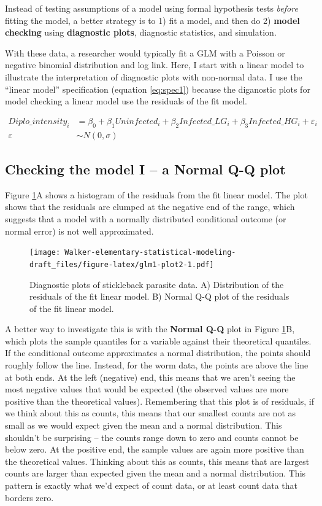 \documentclass[]{book}
\begin{document}
Instead of testing assumptions of a model using formal hypothesis tests
\emph{before} fitting the model, a better strategy is to 1) fit a model,
and then do 2) \textbf{model checking} using \textbf{diagnostic plots},
diagnostic statistics, and simulation.

With these data, a researcher would typically fit a GLM with a Poisson
or negative binomial distribution and log link. Here, I start with a
linear model to illustrate the interpretation of diagnostic plots with
non-normal data. I use the ``linear model'' specification (equation
\eqref{eq:spec1}) because the diganostic plots for model checking a linear
model use the residuals of the fit model.

\begin{align}
Diplo\_intensity_i &= \beta_0 + \beta_1 Uninfected_i + \beta_2 Infected\_LG_i + \beta_3 Infected\_HG_i + \varepsilon_i \\
\varepsilon &\sim N(0, \sigma)
\label{eq:worm-lm}
\end{align}

\subsection{Checking the model I -- a Normal Q-Q
plot}\label{checking-the-model-i-a-normal-q-q-plot}

Figure \ref{fig:glm1-plot2}A shows a histogram of the residuals from the
fit linear model. The plot shows that the residuals are clumped at the
negative end of the range, which suggests that a model with a normally
distributed conditional outcome (or normal error) is not well
approximated.

\begin{figure}
\centering
\texttt{[image: Walker-elementary-statistical-modeling-draft\_files/figure-latex/glm1-plot2-1.pdf]}
\caption{\label{fig:glm1-plot2}Diagnostic plots of stickleback parasite
data. A) Distribution of the residuals of the fit linear model. B)
Normal Q-Q plot of the residuals of the fit linear model.}
\end{figure}

A better way to investigate this is with the \textbf{Normal Q-Q} plot in
Figure \ref{fig:glm1-plot2}B, which plots the sample quantiles for a
variable against their theoretical quantiles. If the conditional outcome
approximates a normal distribution, the points should roughly follow the
line. Instead, for the worm data, the points are above the line at both
ends. At the left (negative) end, this means that we aren't seeing the
most negative values that would be expected (the observed values are
more positive than the theoretical values). Remembering that this plot
is of residuals, if we think about this as counts, this means that our
smallest counts are not as small as we would expect given the mean and a
normal distribution. This shouldn't be surprising -- the counts range
down to zero and counts cannot be below zero. At the positive end, the
sample values are again more positive than the theoretical values.
Thinking about this as counts, this means that are largest counts are
larger than expected given the mean and a normal distribution. This
pattern is exactly what we'd expect of count data, or at least count
data that borders zero.
\end{document}
